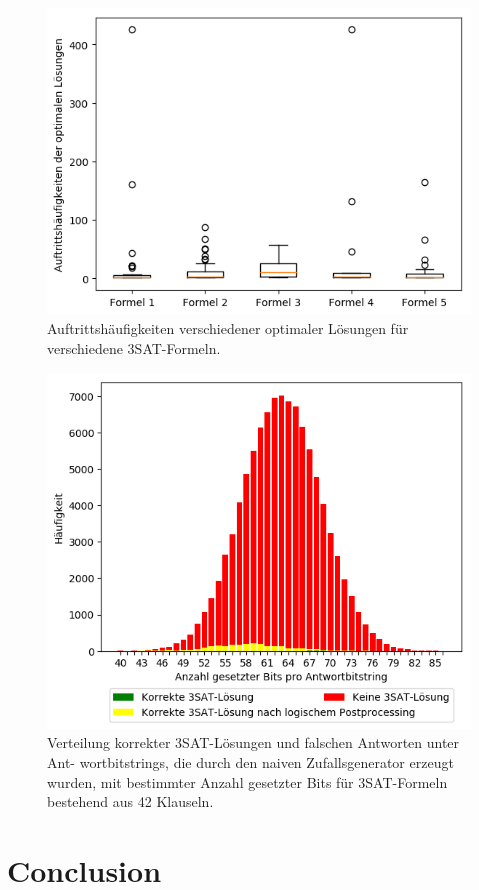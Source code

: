 \documentclass[runningheads]{llncs}
\begin{document}
\begin{figure}
\centering
\includegraphics[width=.8\textwidth]{../material_2/25_clauses__4_2_def_MISBIAS.png}
\caption{Auftrittshäufigkeiten verschiedener optimaler Lösungen für verschiedene 3SAT-Formeln.} \label{fig:distr}
\end{figure}

\begin{figure}
\centering
\includegraphics[width=.8\textwidth]{../material_2/42_clauses__0_2_def_RANDOM_color_transformed.png}%
\caption{Verteilung korrekter 3SAT-Lösungen und falschen Antworten unter Ant- wortbitstrings, die durch den naiven Zufallsgenerator erzeugt wurden, mit bestimmter Anzahl gesetzter Bits für 3SAT-Formeln bestehend aus 42 Klauseln.} \label{fig:distr}
\end{figure}


\section{Conclusion}
%
%
%


%
\end{document}

